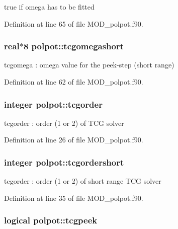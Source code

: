 true if omega has to be fitted 



Definition at line 65 of file M\-O\-D\-\_\-polpot.\-f90.

\hypertarget{classpolpot_a459f9e1fbebf2abc6e657cf1db12669e}{
\subsubsection[{tcgomegashort}]{\setlength{\rightskip}{0pt plus 5cm}real$\ast$8 polpot\-::tcgomegashort}}\label{classpolpot_a459f9e1fbebf2abc6e657cf1db12669e}


tcgomega \-: omega value for the peek-\/step (short range) 



Definition at line 62 of file M\-O\-D\-\_\-polpot.\-f90.

\hypertarget{classpolpot_ad3b3a2ad74be9d5a62eda7d1ac6445b9}{
\subsubsection[{tcgorder}]{\setlength{\rightskip}{0pt plus 5cm}integer polpot\-::tcgorder}}\label{classpolpot_ad3b3a2ad74be9d5a62eda7d1ac6445b9}


tcgorder \-: order (1 or 2) of T\-C\-G solver 



Definition at line 26 of file M\-O\-D\-\_\-polpot.\-f90.

\hypertarget{classpolpot_a1af31eaa1c21a3f380709b6088aff0ff}{
\subsubsection[{tcgordershort}]{\setlength{\rightskip}{0pt plus 5cm}integer polpot\-::tcgordershort}}\label{classpolpot_a1af31eaa1c21a3f380709b6088aff0ff}


tcgorder \-: order (1 or 2) of short range T\-C\-G solver 



Definition at line 35 of file M\-O\-D\-\_\-polpot.\-f90.

\hypertarget{classpolpot_a72bed485465ab67c11d0767d90af8d8d}{
\subsubsection[{tcgpeek}]{\setlength{\rightskip}{0pt plus 5cm}logical polpot\-::tcgpeek}}\label{classpolpot_a72bed485465ab67c11d0767d90af8d8d}


